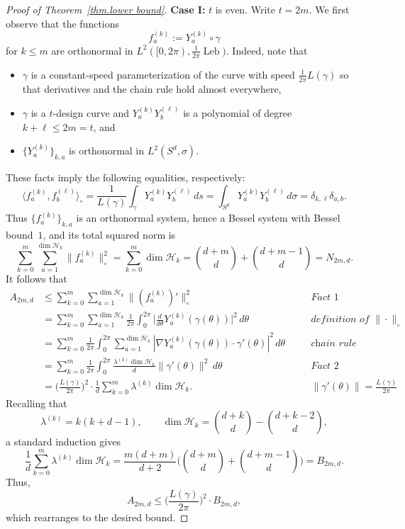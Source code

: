 \documentclass[12pt]{article}
\theoremstyle{plain}
\theoremstyle{definition}
\theoremstyle{remark}
\begin{document}
\begin{proof}[Proof of Theorem~\ref{thm.lower bound}]
\medskip
\noindent
\textbf{Case I:} $t$ is even.
Write $t=2m$.
We first observe that the functions 
\[
f^{(k)}_a
:=Y^{(k)}_a\circ\gamma
\]
for $k\leq m$ are orthonormal in
$L^2([0,2\pi),\frac{1}{2\pi}\operatorname{Leb})$.
Indeed, note that 
\begin{itemize}
\item[(i)]
$\gamma$ is a constant-speed parameterization of the curve with speed
$\frac{1}{2\pi}L(\gamma)$ so that derivatives and the chain rule hold almost everywhere,
\item[(ii)]
$\gamma$ is a $t$-design curve and $Y^{(k)}_aY^{(\ell)}_b$ is a polynomial of
degree $k+\ell\leq 2m=t$, and
\item[(iii)]
$\{Y^{(k)}_a\}_{k,a}$ is orthonormal in $L^2(S^d,\sigma)$.
\end{itemize}
These facts imply the following equalities, respectively:
\[
\langle f^{(k)}_a,f^{(\ell)}_b\rangle_\circ
=
\frac{1}{L(\gamma)}\int_\gamma Y^{(k)}_aY^{(\ell)}_b\,ds
=
\int_{S^d}Y^{(k)}_aY^{(\ell)}_b\,d\sigma
=
\delta_{k,\ell}\delta_{a,b}.
\]
Thus $\{f^{(k)}_a\}_{k,a}$ is an orthonormal system, hence a
Bessel system with Bessel bound~$1$, and its total squared norm is
\[
\sum_{k=0}^m\sum_{a=1}^{\operatorname{dim}\mathcal{H}_k}\|f^{(k)}_a\|_\circ^2
=\sum_{k=0}^m\operatorname{dim}\mathcal{H}_k
=
\binom{d+m}{d}+\binom{d+m-1}{d}
=N_{2m,d}.
\]
It follows that
\[
\begin{aligned}
A_{2m,d}
&\leq
\sum_{k=0}^m
\sum_{a=1}^{\operatorname{dim}\mathcal H_k}
\| (f^{(k)}_a)' \|_\circ^2&&\textit{Fact~1}\\
&=
\sum_{k=0}^m
\sum_{a=1}^{\operatorname{dim}\mathcal H_k}
\frac{1}{2\pi}\int_0^{2\pi}
\bigg|
\frac{d}{d\theta}Y^{(k)}_a(\gamma(\theta))
\bigg|^2\,d\theta&&\textit{definition of \(\|\cdot\|_\circ\)}\\
&=
\sum_{k=0}^m
\frac{1}{2\pi}\int_0^{2\pi}
\sum_{a=1}^{\operatorname{dim}\mathcal H_k}
|\nabla Y^{(k)}_a(\gamma(\theta))\cdot\gamma'(\theta)|^2
\,d\theta\quad&&\textit{chain rule}\\
&=
\sum_{k=0}^m
\frac{1}{2\pi}\int_0^{2\pi}
\frac{\lambda^{(k)}\operatorname{dim}\mathcal H_k}{d}
\|\gamma'(\theta)\|^2\,d\theta&&\textit{Fact~2}\\
&=
\bigg(\frac{L(\gamma)}{2\pi}\bigg)^2\cdot
\frac{1}{d}
\sum_{k=0}^m
\lambda^{(k)}\operatorname{dim}\mathcal H_k.&&\textit{$\|\gamma'(\theta)\|=\frac{L(\gamma)}{2\pi}$}
\end{aligned}
\]
Recalling that
\[
\lambda^{(k)}=k(k+d-1),
\qquad
\operatorname{dim}\mathcal H_k
=
\binom{d+k}{d}-\binom{d+k-2}{d},
\]
a standard induction gives
\[
\frac{1}{d}
\sum_{k=0}^m
\lambda^{(k)}\operatorname{dim}\mathcal H_k
=
\frac{m(d+m)}{d+2}
\bigg(
\binom{d+m}{d}+\binom{d+m-1}{d}
\bigg)
=
B_{2m,d}.
\]
Thus,
\[
A_{2m,d}
\leq
\bigg(\frac{L(\gamma)}{2\pi}\bigg)^2\cdot B_{2m,d},
\]
which rearranges to the desired bound.


\end{proof}
\end{document}

